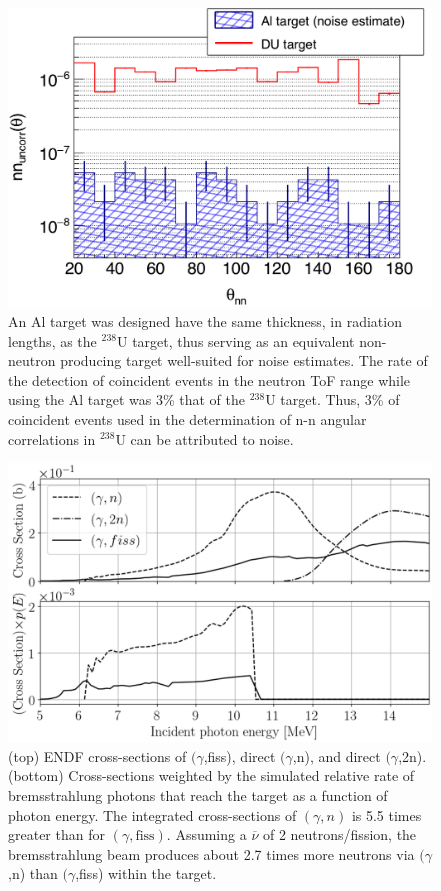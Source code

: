 \begin{figure}[]
\centering
    \includegraphics[width=\figsize\textwidth]{Noise.png}
    \caption{An Al target was designed have the same thickness, in radiation lengths, as the $^{238}$U target, thus serving as an equivalent non-neutron producing target well-suited for noise estimates.
    The rate of the detection of coincident events in the neutron ToF range while using the Al target was 3\% that of the $^{238}$U target.
    Thus, 3\% of coincident events used in the determination of n-n angular correlations in $^{238}$U can be attributed to noise.
        }
    \label{fig:Noise}
\end{figure}
\begin{figure}[]
\centering
    \includegraphics[width=\figsize\textwidth]{CrossSections.png}
    \caption{(top) ENDF cross-sections of $(\gamma$,fiss), direct $(\gamma$,n), and direct $(\gamma$,2n).
    (bottom) Cross-sections weighted by the simulated relative rate of bremsstrahlung photons that reach the target as a function of photon energy. 
    The integrated cross-sections of $(\gamma, n)$ is 5.5 times greater than for $(\gamma, \text{fiss})$. 
    Assuming a $\overline{\nu}$ of 2 neutrons/fission, the bremsstrahlung beam produces about 2.7 times more neutrons via $(\gamma$,n) than $(\gamma$,fiss) within the target.
        \label{fig:CrossSection}
        }
\end{figure}

